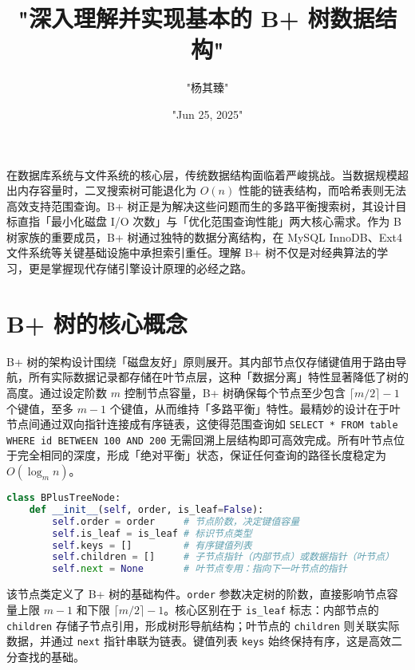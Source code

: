 \title{"深入理解并实现基本的 B+ 树数据结构"}
\author{"杨其臻"}
\date{"Jun 25, 2025"}
\maketitle
在数据库系统与文件系统的核心层，传统数据结构面临着严峻挑战。当数据规模超出内存容量时，二叉搜索树可能退化为 $O(n)$ 性能的链表结构，而哈希表则无法高效支持范围查询。B+ 树正是为解决这些问题而生的多路平衡搜索树，其设计目标直指「最小化磁盘 I/O 次数」与「优化范围查询性能」两大核心需求。作为 B 树家族的重要成员，B+ 树通过独特的数据分离结构，在 MySQL InnoDB、Ext4 文件系统等关键基础设施中承担索引重任。理解 B+ 树不仅是对经典算法的学习，更是掌握现代存储引擎设计原理的必经之路。\par
\chapter{B+ 树的核心概念}
B+ 树的架构设计围绕「磁盘友好」原则展开。其内部节点仅存储键值用于路由导航，所有实际数据记录都存储在叶节点层，这种「数据分离」特性显著降低了树的高度。通过设定阶数 $m$ 控制节点容量，B+ 树确保每个节点至少包含 $\lceil m/2 \rceil -1$ 个键值，至多 $m-1$ 个键值，从而维持「多路平衡」特性。最精妙的设计在于叶节点间通过双向指针连接成有序链表，这使得范围查询如 \texttt{SELECT * FROM table WHERE id BETWEEN 100 AND 200} 无需回溯上层结构即可高效完成。所有叶节点位于完全相同的深度，形成「绝对平衡」状态，保证任何查询的路径长度稳定为 $O(\log_m n)$。\par
\begin{lstlisting}[language=python]
class BPlusTreeNode:
    def __init__(self, order, is_leaf=False):
        self.order = order     # 节点阶数，决定键值容量
        self.is_leaf = is_leaf # 标识节点类型
        self.keys = []         # 有序键值列表
        self.children = []     # 子节点指针（内部节点）或数据指针（叶节点）
        self.next = None       # 叶节点专用：指向下一叶节点的指针
\end{lstlisting}
该节点类定义了 B+ 树的基础构件。\texttt{order} 参数决定树的阶数，直接影响节点容量上限 $m-1$ 和下限 $\lceil m/2 \rceil -1$。核心区别在于 \texttt{is\_{}leaf} 标志：内部节点的 \texttt{children} 存储子节点引用，形成树形导航结构；叶节点的 \texttt{children} 则关联实际数据，并通过 \texttt{next} 指针串联为链表。键值列表 \texttt{keys} 始终保持有序，这是高效二分查找的基础。\par
